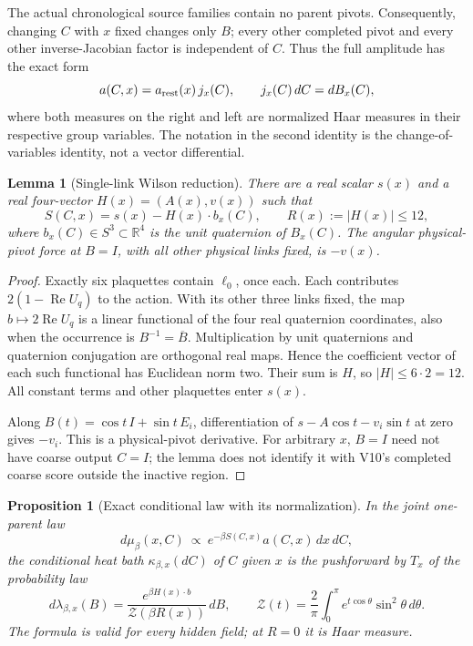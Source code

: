 \documentclass[11pt,oneside]{article}
\newtheorem{proposition}[theorem]{Proposition}
\newtheorem{lemma}[theorem]{Lemma}
\begin{document}
The actual chronological source families contain no
parent pivots. Consequently, changing \(C\) with \(x\)
fixed changes only \(B\); every other completed pivot
and every other inverse-Jacobian factor is independent
of \(C\). Thus the full amplitude has the exact form
\[
 a(C,x)=a_{\rm rest}(x)\,j_x(C),\qquad
 j_x(C)\,dC=dB_x(C),
\]
where both measures on the right and left are
normalized Haar measures in their respective group
variables. The notation in the second identity is
the change-of-variables identity, not a vector
differential.

\begin{lemma}[Single-link Wilson reduction]
\label{lem:f13v11-staple}
There are a real scalar \(s(x)\) and a real
four-vector \(H(x)=(A(x),v(x))\) such that
\begin{equation}\label{eq:f13v11-linear}
 S(C,x)=s(x)-H(x)\cdot b_x(C),\qquad
 R(x):=|H(x)|\le12 ,
\end{equation}
where \(b_x(C)\in S^3\subset\mathbb R^4\) is the unit
quaternion of \(B_x(C)\). The angular physical-pivot
force at \(B=I\), with all other physical links fixed,
is \(-v(x)\).
\end{lemma}

\begin{proof}
Exactly six plaquettes contain \(\ell_0\), once each.
Each contributes \(2(1-\operatorname{Re}U_q)\) to
the action. With its other three links fixed, the
map \(b\mapsto2\operatorname{Re}U_q\) is a linear
functional of the four real quaternion coordinates,
also when the occurrence is \(B^{-1}=\overline B\).
Multiplication by unit quaternions and quaternion
conjugation are orthogonal real maps. Hence the
coefficient vector of each such functional has
Euclidean norm two. Their sum is \(H\), so
\(|H|\le6\cdot2=12\). All constant terms and other
plaquettes enter \(s(x)\).

Along \(B(t)=\cos t\,I+\sin t\,E_i\), differentiation
of \(s-A\cos t-v_i\sin t\) at zero gives \(-v_i\).
This is a physical-pivot derivative. For arbitrary
\(x\), \(B=I\) need not have coarse output \(C=I\);
the lemma does not identify it with V10's completed
coarse score outside the inactive region.
\end{proof}

\begin{proposition}[Exact conditional law with its normalization]
\label{prop:f13v11-conditional}
In the joint one-parent law
\[
 d\mu_\beta(x,C)\ \propto\
       e^{-\beta S(C,x)}a(C,x)\,dx\,dC,
\]
the conditional heat bath \(\kappa_{\beta,x}(dC)\)
of \(C\) given \(x\) is the pushforward by \(T_x\)
of the probability law
\begin{equation}\label{eq:f13v11-vmf}
 d\lambda_{\beta,x}(B)=
 \frac{e^{\beta H(x)\cdot b}}{\mathcal Z(\beta R(x))}\,dB,
 \qquad
 \mathcal Z(t)=\frac2\pi\int_0^\pi
                              e^{t\cos\theta}\sin^2\theta\,d\theta .
\end{equation}
The formula is valid for every hidden field; at
\(R=0\) it is Haar measure.
\end{proposition}
\end{document}
